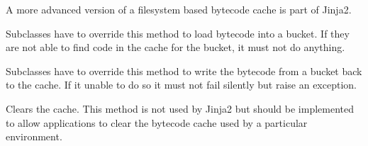 \documentclass[a4paper,10pt,english]{sphinxmanual}
\begin{document}
\begin{fulllineitems}
A more advanced version of a filesystem based bytecode cache is part of
Jinja2.

\begin{fulllineitems}
\label{api:jinja2.BytecodeCache.load_bytecode}
Subclasses have to override this method to load bytecode into a
bucket.  If they are not able to find code in the cache for the
bucket, it must not do anything.

\end{fulllineitems}


\begin{fulllineitems}
\label{api:jinja2.BytecodeCache.dump_bytecode}
Subclasses have to override this method to write the bytecode
from a bucket back to the cache.  If it unable to do so it must not
fail silently but raise an exception.

\end{fulllineitems}


\begin{fulllineitems}
\label{api:jinja2.BytecodeCache.clear}
Clears the cache.  This method is not used by Jinja2 but should be
implemented to allow applications to clear the bytecode cache used
by a particular environment.

\end{fulllineitems}


\end{fulllineitems}

\end{document}
